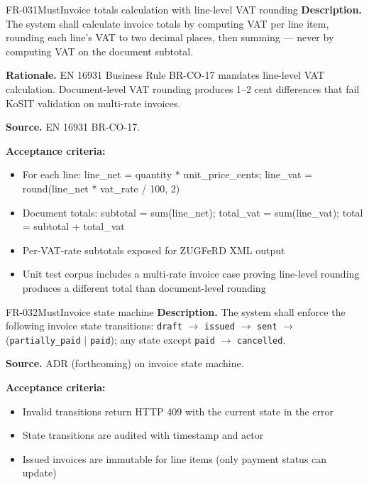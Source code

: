 \documentclass[11pt,a4paper]{article}
\begin{document}
\begin{requirement}{FR-031}{Must}{Invoice totals calculation with line-level VAT rounding}
\textbf{Description.} The system shall calculate invoice totals by computing VAT per line item, rounding each line's VAT to two decimal places, then summing --- never by computing VAT on the document subtotal.

\textbf{Rationale.} EN 16931 Business Rule BR-CO-17 mandates line-level VAT calculation. Document-level VAT rounding produces 1--2 cent differences that fail KoSIT validation on multi-rate invoices.

\textbf{Source.} EN 16931 BR-CO-17.

\textbf{Acceptance criteria:}
\begin{itemize}
    \item For each line: line\_net = quantity * unit\_price\_cents; line\_vat = round(line\_net * vat\_rate / 100, 2)
    \item Document totals: subtotal = sum(line\_net); total\_vat = sum(line\_vat); total = subtotal + total\_vat
    \item Per-VAT-rate subtotals exposed for ZUGFeRD XML output
    \item Unit test corpus includes a multi-rate invoice case proving line-level rounding produces a different total than document-level rounding
\end{itemize}
\end{requirement}

\begin{requirement}{FR-032}{Must}{Invoice state machine}
\textbf{Description.} The system shall enforce the following invoice state transitions: \texttt{draft} $\rightarrow$ \texttt{issued} $\rightarrow$ \texttt{sent} $\rightarrow$ (\texttt{partially\_paid} $|$ \texttt{paid}); any state except \texttt{paid} $\rightarrow$ \texttt{cancelled}.

\textbf{Source.} ADR (forthcoming) on invoice state machine.

\textbf{Acceptance criteria:}
\begin{itemize}
    \item Invalid transitions return HTTP 409 with the current state in the error
    \item State transitions are audited with timestamp and actor
    \item Issued invoices are immutable for line items (only payment status can update)
\end{itemize}
\end{requirement}
\end{document}
